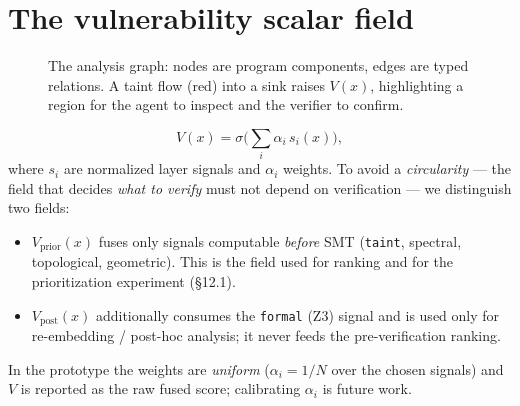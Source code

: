 \documentclass[11pt]{article}
\begin{document}
\section{The vulnerability scalar field}
\begin{figure}[h]
\centering
{}
\caption{The analysis graph: nodes are program components, edges are typed relations.
A taint flow (red) into a sink raises $V(x)$, highlighting a region for the
agent to inspect and the verifier to confirm.}
\end{figure}
\[
V(x) = \sigma\!\Big(\textstyle\sum_i \alpha_i \, s_i(x)\Big),
\]
where $s_i$ are normalized layer signals and $\alpha_i$ weights. To avoid a
\emph{circularity} --- the field that decides \emph{what to verify} must not
depend on verification --- we distinguish two fields:
\begin{itemize}[leftmargin=1.5em]
  \item $V_{\text{prior}}(x)$ fuses only signals computable \emph{before} SMT
        (\texttt{taint}, spectral, topological, geometric). This is the field used
        for ranking and for the prioritization experiment (\S12.1).
  \item $V_{\text{post}}(x)$ additionally consumes the \texttt{formal} (Z3) signal
        and is used only for re-embedding / post-hoc analysis; it never feeds the
        pre-verification ranking.
\end{itemize}
In the prototype the weights are \emph{uniform} ($\alpha_i = 1/N$ over the chosen
signals) and $V$ is reported as the raw fused score; calibrating $\alpha_i$ is
future work.
\end{document}
